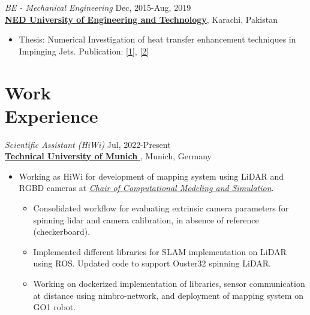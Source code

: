 \documentclass[margin, 10pt]{res} %
\begin{document}
\begin{resume}
\begin{itemize}
\end{itemize} 

\emph{BE - Mechanical Engineering} \hfill Dec, 2015-Aug, 2019 \\
\href{https://www.neduet.edu.pk/}{\textbf{NED University of Engineering and Technology}}, Karachi, Pakistan
\begin{itemize}
\item Thesis: Numerical Investigation of heat transfer enhancement techniques in Impinging Jets. Publication: \href{https://doi.org/10.1002/htj.21986}{[1]}, \href{https://www.dl.begellhouse.com/references/4c8f5faa331b09ea,212bf76947bffc03,5aa059fb1b898ef8.html}{[2]}
\end{itemize} 




 
\section{Work\\ Experience \\}

\emph{Scientific Assistant (HiWi) } \hfill {\small Jul, 2022-Present} \\
\href{https://www.tum.de/en/}{\textbf{Technical University of Munich} }, Munich, Germany
\begin{itemize}
\item Working as HiWi for development of mapping system using LiDAR and RGBD cameras at \href{https://www.cms.bgu.tum.de/de/}{\emph{ Chair of Computational Modeling and Simulation}}.
   \begin{itemize}
    \item Consolidated workflow for evaluating extrinsic camera parameters for spinning lidar and camera calibration, in absence of reference (checkerboard).
    \item Implemented different libraries for SLAM implementation on LiDAR using ROS. Updated code to support Ouster32 spinning LiDAR. 
    \item Working on dockerized implementation of libraries, sensor communication at distance using nimbro-network, and deployment of mapping system on GO1 robot.
    

\end{itemize}
\end{itemize}
\end{resume}
\end{document}
